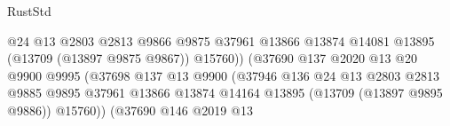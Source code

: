 \begin{lexlean}{RustStd}
\begin{coremodule}
                                                      @24
                                                      @13
                                                      @2803
                                                      @2813
                                                      @9866
                                                      @9875
                                                      @37961
                                                      @13866
                                                      @13874
                                                      @14081
                                                      @13895
                                                      (@13709 (@13897 @9875 @9867))
                                                      @15760))
                                                  (@37690
                                                    @137
                                                    @2020
                                                    @13
                                                    @20
                                                    @9900
                                                    @9995
                                                    (@37698
                                                      @137
                                                      @13
                                                      @9900
                                                      (@37946
                                                        @136
                                                        @24
                                                        @13
                                                        @2803
                                                        @2813
                                                        @9885
                                                        @9895
                                                        @37961
                                                        @13866
                                                        @13874
                                                        @14164
                                                        @13895
                                                        (@13709 (@13897 @9895 @9886))
                                                        @15760))
                                                    (@37690
                                                      @146
                                                      @2019
                                                      @13

\end{coremodule}
\end{lexlean}
